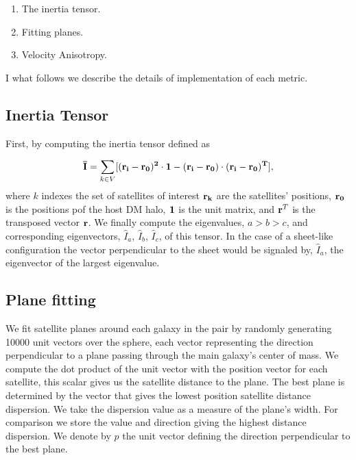 \documentclass[a4paper,fleqn,usenatbib]{mnras}
\begin{document}
\begin{enumerate}
\item{The inertia tensor}.
\item{Fitting planes}.
\item{Velocity Anisotropy}.
\end{enumerate}

I what follows we describe the details of implementation of each
metric.


\subsection{Inertia Tensor}
\label{sub:inertia}
First, by computing the inertia tensor defined as 

\begin{equation}
{\bf{\bar{I}}} = \sum_{k \in V}[(\bf{r}_i - \bf{r}_0)^2\cdot \bf{1} -
  (\bf{r}_i-\bf{r}_0)\cdot (\bf{r}_i - \bf{r}_0)^{T}],
\end{equation}
%
where $k$ indexes the set of satellites of interest
$\bf{r}_k$ are the satellites' positions, $\bf{r}_{0}$ is the
positions pof the host DM halo, $\bf{1}$ is the unit matrix,  and
${\bf r}^T$ is the transposed vector $\bf{r}$. 
We finally compute the eigenvalues, $a>b>c$, and corresponding
eigenvectors, $\hat{I}_a$, $\hat{I}_b$, $\hat{I}_c$, of this tensor.
In the case of a sheet-like configuration the vector perpendicular to
the sheet would be signaled by, $\hat{I}_a$, the eigenvector of the
largest eigenvalue. 


\subsection{Plane fitting}
\label{sub:planes}

We fit satellite planes around each galaxy in the pair by randomly
generating 10000 unit vectors over the  sphere, each vector
representing the direction perpendicular to a plane passing through
the main galaxy's center of mass. 
We compute the dot product of the unit vector with the position vector
for each satellite, this scalar gives us the satellite distance to the
plane. 
The best plane is determined by the vector that gives the lowest
position satellite distance dispersion. 
We take the dispersion value as a measure of the plane's width.
For comparison we store the value and direction giving the
highest distance dispersion.
We denote by $\hat{p}$ the unit vector defining the direction
perpendicular to the best plane.
\end{document}
